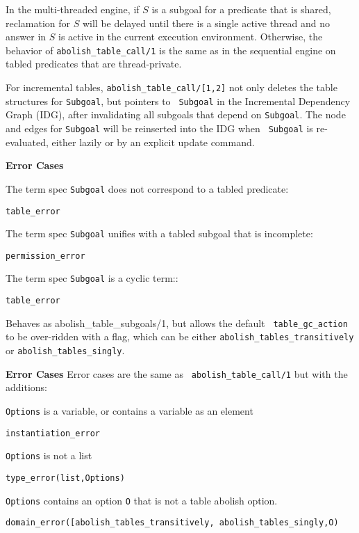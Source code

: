\begin{description}
\begin{description}
In the multi-threaded engine, if $S$ is a subgoal for a predicate that
is shared, reclamation for $S$ will be delayed until there is a single
active thread and no answer in $S$ is active in the current execution
environment.  Otherwise, the behavior of {\tt abolish\_table\_call/1}
is the same as in the sequential engine on tabled predicates that are
thread-private.

%
For incremental tables, {\tt abolish\_table\_call/[1,2]} not only
deletes the table structures for {\tt Subgoal}, but pointers to {\tt
  Subgoal} in the Incremental Dependency Graph (IDG), after
invalidating all subgoals that depend on {\tt Subgoal}. The node and
edges for {\tt Subgoal} will be reinserted into the IDG when {\tt
  Subgoal} is re-evaluated, either lazily or by an explicit update
command.


{\bf Error Cases}
\bi
\item The term spec {\tt Subgoal} does not correspond to a tabled predicate:
\bi
\item 	{\tt table\_error}
\ei
\item The term spec {\tt Subgoal} unifies with a tabled subgoal that is incomplete:
\bi
\item 	{\tt permission\_error}
\ei
\item The term spec {\tt Subgoal} is a cyclic term::
\bi
\item 	{\tt table\_error}
\ei
\ei
%

%
Behaves as {abolish\_table\_subgoals/1}, but allows the default {\tt
  table\_gc\_action} to be over-ridden with a flag, which can be either 
{\tt abolish\_tables\_transitively} or {\tt abolish\_tables\_singly}.

{\bf Error Cases} Error cases are the same as {\tt
  abolish\_table\_call/1} but with the additions: 
\bi
\item {\tt Options} is a variable, or contains a variable as an element
\bi
\item {\tt instantiation\_error}
\ei
\item {\tt Options} is not a list
\bi
\item {\tt type\_error(list,Options)}
\ei
\item {\tt Options} contains an option {\tt O} that is not a
  table abolish option.
\bi
\item {\tt domain\_error([abolish\_tables\_transitively, abolish\_tables\_singly,O)}
\ei
\ei


\end{description}
\end{description}

